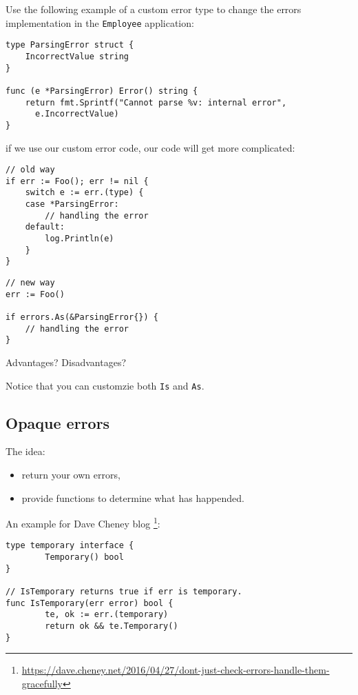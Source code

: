 \documentclass[11pt, letterpaper]{article}
\begin{document}
Use the following example of a custom error type to change the errors implementation in the \verb|Employee| application:

\begin{verbatim}
type ParsingError struct {
    IncorrectValue string
}

func (e *ParsingError) Error() string {
    return fmt.Sprintf("Cannot parse %v: internal error",
      e.IncorrectValue)
}
\end{verbatim}

if we use our custom error code, our code will get more complicated:

\begin{verbatim}
// old way
if err := Foo(); err != nil {
    switch e := err.(type) {
    case *ParsingError:
        // handling the error
    default:
        log.Println(e)
    }
}
\end{verbatim}

\begin{verbatim}
// new way
err := Foo()

if errors.As(&ParsingError{}) {
	// handling the error
}
\end{verbatim}

Advantages? Disadvantages?
\bigskip

Notice that you can customzie both \texttt{Is} and \texttt{As}.
\pagebreak

\subsection{Opaque errors}

The idea:

\begin{itemize}
\item return your own errors,
\item provide functions to determine what has happended.
\end{itemize}

An example for Dave Cheney blog \footnote{\href{https://dave.cheney.net/2016/04/27/dont-just-check-errors-handle-them-gracefully}{https://dave.cheney.net/2016/04/27/dont-just-check-errors-handle-them-gracefully}}:

\begin{verbatim}
type temporary interface {
        Temporary() bool
}
 
// IsTemporary returns true if err is temporary.
func IsTemporary(err error) bool {
        te, ok := err.(temporary)
        return ok && te.Temporary()
}
\end{verbatim}
\end{document}
